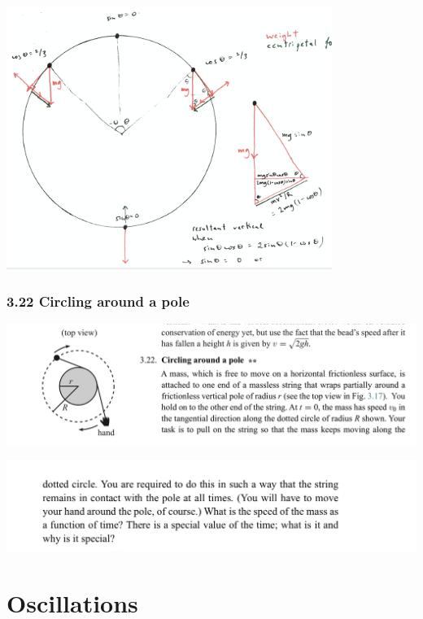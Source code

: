 \begin{mdframed}
  \includegraphics[width=300pt]{img/physics--classical-mechanics--morin--3-21-diag-2.png}
\end{mdframed}


\newpage
\subsubsection*{3.22 Circling around a pole}
\begin{mdframed}
  \includegraphics[width=400pt]{img/physics--classical-mechanics--morin--3-22.png}
\end{mdframed}
\begin{mdframed}
  \includegraphics[width=400pt]{img/physics--classical-mechanics--morin--3-22-2.png}
\end{mdframed}




\section{Oscillations}





